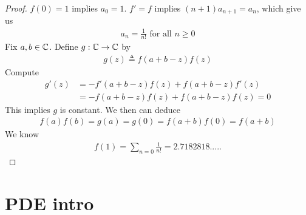 \documentclass{report}
\begin{document}
\begin{proof}
$f(0)=1$ implies $a_0=1$.  $f'=f$ implies  $(n+1)a_{n+1}=a_n$, which give us 
\begin{align*}
a_n= \frac{1}{n!}\text{ for all }n\geq 0
\end{align*}
Fix $a,b \in\mathbb{C}$. Define $g:\mathbb{C}\rightarrow \mathbb{C}$ by 
\begin{align*}
g(z)\triangleq f(a+b-z)f(z)
\end{align*}
Compute 
\begin{align*}
g'(z)&=-f'(a+b-z)f(z)+f(a+b-z)f'(z)\\
&=-f(a+b-z)f(z)+f(a+b-z)f(z)=0
\end{align*}
This implies $g$ is constant. We then can deduce 
\begin{align*}
f(a)f(b)=g(a)=g(0)=f(a+b)f(0)=f(a+b)
\end{align*}
We know 
\begin{align*}
f(1)=\sum_{n=0} \frac{1}{n!}=2.7182818.....
\end{align*}
\end{proof}
\chapter{PDE intro}
\end{document}
